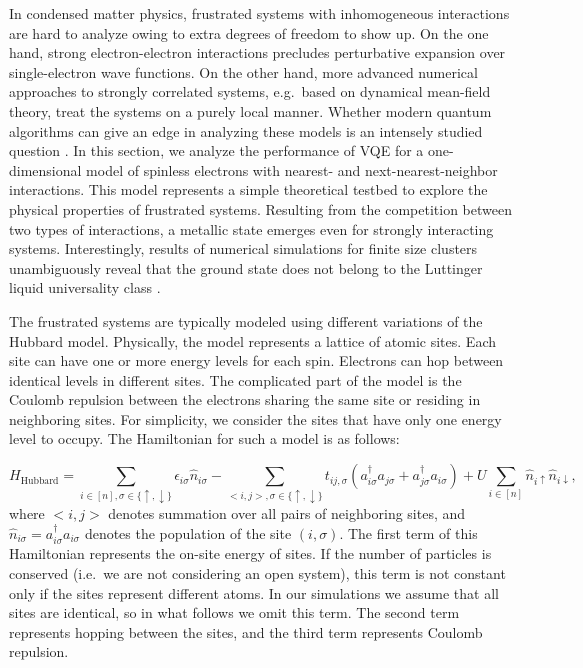 In condensed matter physics, frustrated systems with inhomogeneous interactions are hard to analyze owing to extra degrees of freedom to show up. On the one hand, strong electron-electron interactions precludes perturbative expansion over single-electron wave functions. On the other hand, more advanced numerical approaches to strongly correlated systems, e.g.~based on dynamical mean-field theory, treat the systems on a purely local manner. Whether modern quantum algorithms can give an edge in analyzing these models is an intensely studied question \cite{cade_strategies_2019,rungger_dynamical_2019,jaderberg_minimum_2020}. In this section, we analyze the performance of VQE for a one-dimensional model of spinless electrons with nearest- and next-nearest-neighbor interactions. This model represents a simple theoretical testbed to explore the physical properties of frustrated systems. Resulting from the competition between two types of interactions, a metallic state emerges even for strongly interacting systems. Interestingly, results of numerical simulations for finite size clusters unambiguously reveal that the ground state does not belong to the Luttinger liquid universality class \cite{Zhuravlev1997,zhuravlev_breakdown_2000,zhuravlev_one-dimensional_2001,Hohenadler2012,Karrasch2012}.

The frustrated systems are typically modeled using different variations of the Hubbard model. Physically, the model represents a lattice of atomic sites. Each site can have one or more energy levels for each spin. Electrons can hop between identical levels in different sites. The complicated part of the model is the Coulomb repulsion between the electrons sharing the same site or residing in neighboring sites. For simplicity, we consider the sites that have only one energy level to occupy. The Hamiltonian for such a model is as follows:

\begin{equation}
    H_{\text{Hubbard}} = \sum_{i \in [n], \sigma \in \{\uparrow, \downarrow\}} \epsilon_{i \sigma} \hat{n}_{i \sigma}
    - \sum_{<i, j>, \sigma \in \{\uparrow, \downarrow\}} t_{ij, \sigma} (a^\dagger_{i \sigma} a_{j \sigma} + a^\dagger_{j \sigma} a_{i \sigma})
    + U \sum_{i \in [n]} \hat{n}_{i \uparrow} \hat{n}_{i \downarrow},
\end{equation}
where $<i,j>$ denotes summation over all pairs of neighboring sites, and $\hat{n}_{i \sigma} = a^\dagger_{i \sigma} a_{i \sigma}$ denotes the population of the site $(i, \sigma)$. The first term of this Hamiltonian represents the on-site energy of sites. If the number of particles is conserved (i.e.~we are not considering an open system), this term is not constant only if the sites represent different atoms. In our simulations we assume that all sites are identical, so in what follows we omit this term. The second term represents hopping between the sites, and the third term represents Coulomb repulsion.

